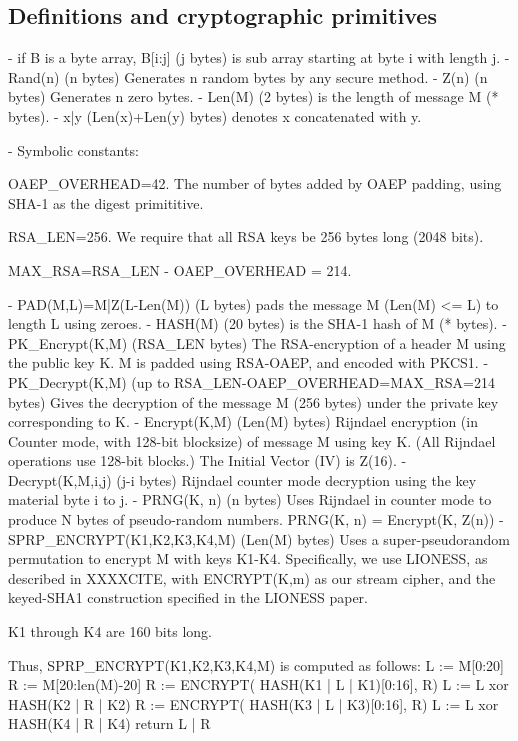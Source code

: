 \subsection{Definitions and cryptographic primitives}

- if B is a byte array, B[i:j] (j bytes) is sub array starting at 
  byte i with length j.
- Rand(n) (n bytes) Generates n random bytes by any secure method.
- Z(n) (n bytes) Generates n zero bytes.
- Len(M) (2 bytes) is the length of message M (* bytes).
- x|y (Len(x)+Len(y) bytes) denotes x concatenated with y.

- Symbolic constants:

   OAEP_OVERHEAD=42.   The number of bytes added by OAEP padding,
   using SHA-1 as the digest primititive.

   RSA_LEN=256.   We require that all RSA keys be 256 bytes long
   (2048 bits).

   MAX_RSA=RSA_LEN - OAEP_OVERHEAD = 214.

- PAD(M,L)=M|Z(L-Len(M)) (L bytes) pads the message M (Len(M) <= L)
  to length L using zeroes.
- HASH(M) (20 bytes) is the SHA-1 hash of M (* bytes).
- PK_Encrypt(K,M) (RSA_LEN bytes) The RSA-encryption of a header M 
  using the public key K.  M is padded using RSA-OAEP, and encoded
  with PKCS1.
- PK_Decrypt(K,M) (up to RSA_LEN-OAEP_OVERHEAD=MAX_RSA=214 bytes) 
  Gives the decryption of the message M (256 bytes) under the private
  key corresponding to K.
- Encrypt(K,M) (Len(M) bytes) Rijndael encryption (in Counter mode,
  with 128-bit blocksize) of message M using key K.  (All Rijndael
  operations use 128-bit blocks.)  The Initial Vector (IV) is Z(16).
- Decrypt(K,M,i,j) (j-i bytes) Rijndael counter mode decryption 
  using the key material byte i to j.
- PRNG(K, n) (n bytes) Uses Rijndael in counter mode to produce N
  bytes of pseudo-random numbers.
  PRNG(K, n) = Encrypt(K, Z(n))
- SPRP_ENCRYPT(K1,K2,K3,K4,M) (Len(M) bytes) Uses a super-pseudorandom
  permutation to encrypt M with keys K1-K4.  Specifically, we use LIONESS,
  as described in XXXXCITE, with ENCRYPT(K,m) as our stream cipher,
  and the keyed-SHA1 construction specified in the LIONESS paper.

  K1 through K4 are 160 bits long.

  Thus, SPRP_ENCRYPT(K1,K2,K3,K4,M) is computed as follows:
            L := M[0:20]
            R := M[20:len(M)-20]
            R := ENCRYPT( HASH(K1 | L | K1)[0:16], R)
            L := L xor HASH(K2 | R | K2)
            R := ENCRYPT( HASH(K3 | L | K3)[0:16], R)
            L := L xor HASH(K4 | R | K4) 
            return L | R

